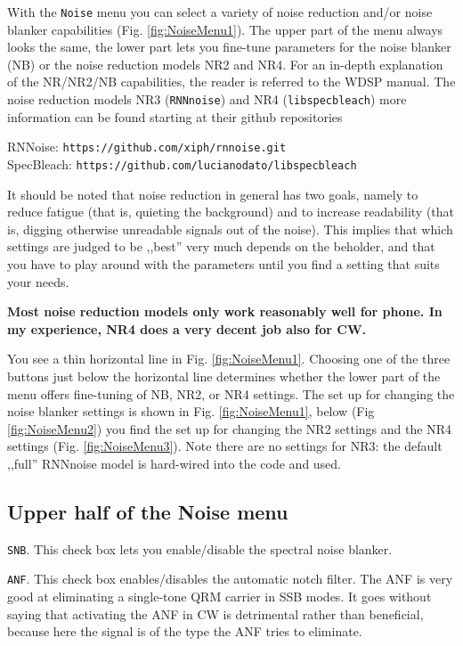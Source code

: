 \documentclass[12pt]{book}
\def\rett#1{\texttt{\color{red}#1}}
\def\bltt#1{\texttt{\color{blue}#1}}
\begin{document}
With the \bltt{Noise} menu you can select a variety of noise reduction and/or
noise blanker capabilities (Fig. \ref{fig:NoiseMenu1}). The upper part of the
menu always looks the same, the lower part lets you fine-tune
parameters for the noise blanker (NB) or the noise reduction models NR2 and NR4.
 For an in-depth explanation of the NR/NR2/NB
capabilities, the reader is referred to the WDSP manual. The noise reduction
models NR3 (\texttt{RNNnoise}) and NR4 (\texttt{libspecbleach}) more information can
be found starting at their github repositories

RNNoise: \texttt{https://github.com/xiph/rnnoise.git} \\
SpecBleach: \texttt{https://github.com/lucianodato/libspecbleach}

It should be noted that noise reduction in general has two
goals, namely to reduce fatigue (that is, quieting the background)
and to increase readability (that is, digging otherwise unreadable signals out of the noise).
This implies that which settings
are judged to be ,,best'' very much depends on the beholder,
and that you have to play around with the parameters until you find a setting that
suits your needs.

\textbf{Most noise reduction models only work reasonably well for phone. In my experience, NR4 does
a very decent job also for CW.}

You see a thin horizontal line in Fig. \ref{fig:NoiseMenu1}.
Choosing one of the three buttons just below the horizontal line determines whether the
lower part of the menu offers fine-tuning of NB, NR2, or NR4 settings.
The set up for changing the noise blanker settings is shown in Fig. \ref{fig:NoiseMenu1},
below (Fig \ref{fig:NoiseMenu2}) you find the set up for changing the NR2 settings
and the NR4 settings (Fig. \ref{fig:NoiseMenu3}). Note there are no settings for NR3:
the default ,,full'' RNNnoise model is hard-wired into the code and used.

\subsection{Upper half of the Noise menu}

\rett{SNB}. This check box lets you enable/disable the spectral noise blanker.

\rett{ANF}. This check box enables/disables the automatic notch filter. The ANF is
very good at eliminating a single-tone QRM carrier in SSB modes. It goes without
saying that activating the ANF in CW is detrimental rather than beneficial, because
here the signal is of the type the ANF tries to eliminate.
\end{document}

